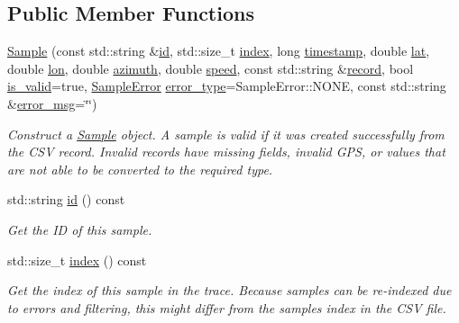 \subsection*{Public Member Functions}
\begin{DoxyCompactItemize}
\item 
\hyperlink{classgeo__data_1_1Sample_a8d91847711c56badc1bce86f85ef23e4}{Sample} (const std\+::string \&\hyperlink{classgeo__data_1_1Sample_aa529b9aef77c02620eac7a5ada4adcb3}{id}, std\+::size\+\_\+t \hyperlink{classgeo__data_1_1Sample_a68267127a7cb00839ec904fcc0b9f64b}{index}, long \hyperlink{classgeo__data_1_1Sample_a7c6cd5157117296b306f8e5726737090}{timestamp}, double \hyperlink{classgeo__data_1_1Sample_a89ad23a22a5043e61e08129783333e4c}{lat}, double \hyperlink{classgeo__data_1_1Sample_a0f3322502b9f32fbc51462e4b6270381}{lon}, double \hyperlink{classgeo__data_1_1Sample_a9be314cd78a47730551e6169748edc96}{azimuth}, double \hyperlink{classgeo__data_1_1Sample_a77437a286640779148c3f4905b90a16c}{speed}, const std\+::string \&\hyperlink{classgeo__data_1_1Sample_ac7ebb4bddcc448ab65843f29f7e3d2a5}{record}, bool \hyperlink{classgeo__data_1_1Sample_ae009ad7cc3106219b77123ba4e5d3238}{is\+\_\+valid}=true, \hyperlink{namespacegeo__data_a2374ba83ef1f8bcad5d82c67dc7c8ddd}{Sample\+Error} \hyperlink{classgeo__data_1_1Sample_a6aaf864d36093ef23cb5a273d45f4f01}{error\+\_\+type}=Sample\+Error\+::\+N\+O\+NE, const std\+::string \&\hyperlink{classgeo__data_1_1Sample_a5ad107d3bca8ca053e785f24efae6c28}{error\+\_\+msg}=\char`\"{}\char`\"{})
\begin{DoxyCompactList}\small\item\em Construct a \hyperlink{classgeo__data_1_1Sample}{Sample} object. A sample is valid if it was created successfully from the C\+SV record. Invalid records have missing fields, invalid G\+PS, or values that are not able to be converted to the required type. \end{DoxyCompactList}\item 
std\+::string \hyperlink{classgeo__data_1_1Sample_aa529b9aef77c02620eac7a5ada4adcb3}{id} () const 
\begin{DoxyCompactList}\small\item\em Get the ID of this sample. \end{DoxyCompactList}\item 
std\+::size\+\_\+t \hyperlink{classgeo__data_1_1Sample_a68267127a7cb00839ec904fcc0b9f64b}{index} () const 
\begin{DoxyCompactList}\small\item\em Get the index of this sample in the trace. Because sample\textquotesingle{}s can be re-\/indexed due to errors and filtering, this might differ from the sample\textquotesingle{}s index in the C\+SV file. \end{DoxyCompactList}\item 

\end{DoxyCompactItemize}
